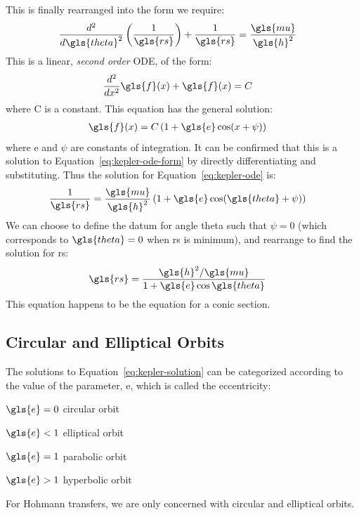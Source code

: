 \documentclass[12pt,openany]{book}
\begin{document}
This is finally rearranged into the form we require:
\begin{align}
  \frac{d^2}{d\gls{theta}^2}\left(\frac{1}{\gls{rs}}\right) + \frac{1}{\gls{rs}}
  &= \frac{\gls{mu}}{\gls{h}^2} \label{eq:kepler-ode}
\end{align}
This is a linear, \emph{second order} ODE, of the form:
\begin{align}
  \frac{d^2}{dx^2}\gls{f}(x) + \gls{f}(x) &= C \label{eq:kepler-ode-form}
\end{align}
where C is a constant. This equation has the general solution:
\begin{align}
  \gls{f}(x) &= C\left(1 + \gls{e}\cos(x + \psi)\right)
\end{align}
where \gls{e} and \(\psi\) are constants of integration. It can be confirmed that this is a solution to Equation~\ref{eq:kepler-ode-form} by directly differentiating and substituting. Thus the solution for Equation~\ref{eq:kepler-ode} is:
\begin{align}
  \frac{1}{\gls{rs}}
  &= \frac{\gls{mu}}{\gls{h}^2}
  \left(
    1 + \gls{e}\cos(\gls{theta} + \psi)
  \right)
\end{align}
We can choose to define the datum for angle \gls{theta} such that \(\psi = 0\) (which corresponds to \(\gls{theta} = 0\) when \gls{rs} is minimum), and rearrange to find the solution for \gls{rs}:
\begin{align}
  \gls{rs} &= \frac{\gls{h}^2/\gls{mu}}{1 + \gls{e}\cos\gls{theta}} \label{eq:kepler-solution}
\end{align}
This equation happens to be the equation for a conic section.

\subsection{Circular and Elliptical Orbits}

The solutions to Equation~\ref{eq:kepler-solution} can be categorized according to the value of the parameter, \gls{e}, which is called the eccentricity:
\begin{pardescription}[leftmargin=4em,style=nextline]
\item[\(\gls{e} = 0\)] circular orbit
\item[\(\gls{e} < 1\)] elliptical orbit
\item[\(\gls{e} = 1\)] parabolic orbit
\item[\(\gls{e} > 1\)] hyperbolic orbit
\end{pardescription}
For Hohmann transfers, we are only concerned with circular and elliptical orbits.
\end{document}
